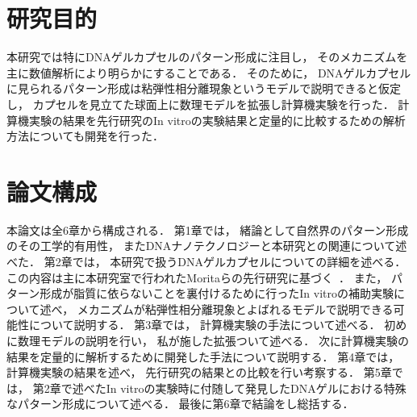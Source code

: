 \section{研究目的}
本研究では特にDNAゲルカプセルのパターン形成に注目し，
そのメカニズムを主に数値解析により明らかにすることである．
そのために，
DNAゲルカプセルに見られるパターン形成は粘弾性相分離現象というモデルで説明できると仮定し，
カプセルを見立てた球面上に数理モデルを拡張し計算機実験を行った．
計算機実験の結果を先行研究のIn vitroの実験結果と定量的に比較するための解析方法についても開発を行った．

\section{論文構成}
本論文は全6章から構成される．
第1章では，
緒論として自然界のパターン形成のその工学的有用性，
またDNAナノテクノロジーと本研究との関連について述べた．
第2章では，
本研究で扱うDNAゲルカプセルについての詳細を述べる．
この内容は主に本研究室で行われたMoritaらの先行研究に基づく~\cite{morita2017formation}．
また，
パターン形成が脂質に依らないことを裏付けるために行ったIn vitroの補助実験について述べ，
メカニズムが粘弾性相分離現象とよばれるモデルで説明できる可能性について説明する．
第3章では，
計算機実験の手法について述べる．
初めに数理モデルの説明を行い，
私が施した拡張ついて述べる．
次に計算機実験の結果を定量的に解析するために開発した手法について説明する．
第4章では，
計算機実験の結果を述べ，
先行研究の結果との比較を行い考察する．
第5章では，
第2章で述べたIn vitroの実験時に付随して発見したDNAゲルにおける特殊なパターン形成について述べる．
最後に第6章で結論をし総括する．
